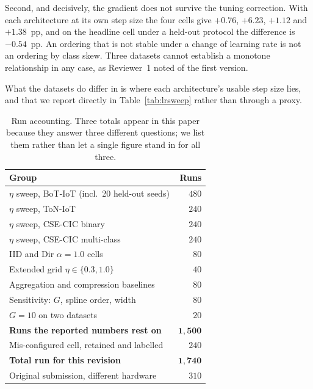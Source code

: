 Second, and decisively, the gradient does not survive the tuning correction. With each
architecture at its own step size the four cells give $+0.76$, $+6.23$, $+1.12$ and $+1.38$~pp,
and on the headline cell under a held-out protocol the difference is $-0.54$~pp. An ordering that
is not stable under a change of learning rate is not an ordering by class skew. Three datasets
cannot establish a monotone relationship in any case, as Reviewer~1 noted of the first version.

What the datasets do differ in is where each architecture's usable step size lies, and that we
report directly in Table~\ref{tab:lrsweep} rather than through a proxy.

\begin{table}[t]
\caption{Run accounting. Three totals appear in this paper because they answer three different
questions; we list them rather than let a single figure stand in for all three.}
\label{tab:runaccount}
\centering
\footnotesize
\begin{tabular}{@{}lr@{}}
\toprule
Group & Runs \\
\midrule
$\eta$ sweep, BoT-IoT (incl.\ 20 held-out seeds) & $480$ \\
$\eta$ sweep, ToN-IoT                            & $240$ \\
$\eta$ sweep, CSE-CIC binary                     & $240$ \\
$\eta$ sweep, CSE-CIC multi-class                & $240$ \\
IID and Dir $\alpha{=}1.0$ cells                 & $80$ \\
Extended grid $\eta \in \{0.3, 1.0\}$            & $40$ \\
Aggregation and compression baselines            & $80$ \\
Sensitivity: $G$, spline order, width            & $80$ \\
$G{=}10$ on two datasets                         & $20$ \\
\midrule
\textbf{Runs the reported numbers rest on}       & $\mathbf{1{,}500}$ \\
Mis-configured cell, retained and labelled       & $240$ \\
\textbf{Total run for this revision}             & $\mathbf{1{,}740}$ \\
Original submission, different hardware          & $310$ \\
\bottomrule
\end{tabular}
\end{table}

